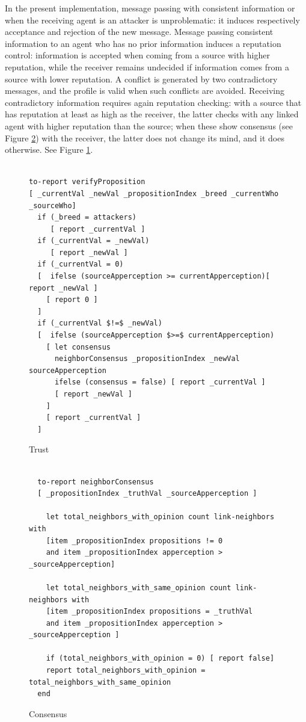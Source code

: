 \documentclass[compsoc, conference, letterpaper, 10pt, times]{IEEEtran}
\begin{document}
In the present implementation, message passing with consistent information or when the receiving agent is an attacker is unproblematic: it induces respectively acceptance and rejection of the new message. Message passing consistent information to an agent who has no prior information induces a reputation control: information is accepted when coming from a source with higher reputation, while the receiver remains undecided if information comes from a source with lower reputation. A conflict is generated by two contradictory messages, and the profile is valid when such conflicts are avoided. Receiving contradictory information requires again reputation checking: with a source that has reputation at least as high as the receiver, the latter checks with any linked agent with higher reputation than the source; when these show consensus (see Figure \ref{fig:consensus}) with the receiver, the latter does not change its mind, and it does otherwise. See Figure \ref{fig:passing1}.


\begin{figure}[t]
 	\lstset{language=Java,
 		basicstyle=\scriptsize,
 		mathescape}
 	\begin{lstlisting}[frame=single]  % Start your code-block

to-report verifyProposition
[ _currentVal _newVal _propositionIndex _breed _currentWho _sourceWho]
  if (_breed = attackers)
     [ report _currentVal ]
  if (_currentVal = _newVal)
     [ report _newVal ]
  if (_currentVal = 0)
  [  ifelse (sourceApperception >= currentApperception)[ report _newVal ]
    [ report 0 ]
  ]
  if (_currentVal $!=$ _newVal)
  [  ifelse (sourceApperception $>=$ currentApperception)
    [ let consensus
      neighborConsensus _propositionIndex _newVal sourceApperception
      ifelse (consensus = false) [ report _currentVal ]
      [ report _newVal ]
    ]
    [ report _currentVal ]
  ]
  \end{lstlisting}
  \caption{Trust}\label{fig:passing1}
\end{figure}


\begin{figure}[t]
 	\lstset{language=Java,
 		basicstyle=\scriptsize,
 		mathescape}
 	\begin{lstlisting}[frame=single]  % Start your code-block

  to-report neighborConsensus
  [ _propositionIndex _truthVal _sourceApperception ]

    let total_neighbors_with_opinion count link-neighbors with
    [item _propositionIndex propositions != 0
    and item _propositionIndex apperception > _sourceApperception]

    let total_neighbors_with_same_opinion count link-neighbors with
    [item _propositionIndex propositions = _truthVal
    and item _propositionIndex apperception > _sourceApperception ]

    if (total_neighbors_with_opinion = 0) [ report false]
    report total_neighbors_with_opinion = total_neighbors_with_same_opinion
  end
  \end{lstlisting}
  \caption{Consensus}\label{fig:consensus}
\end{figure}
%
%
\end{document}
